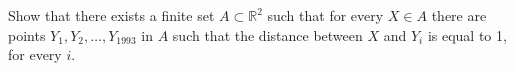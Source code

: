 Show that there exists a finite set $A \subset \mathbb{R}^2$ such that for every $X \in A$ there are points $Y_1, Y_2, \ldots, Y_{1993}$ in $A$ such that the distance between $X$ and $Y_i$ is equal to 1, for every $i$.
